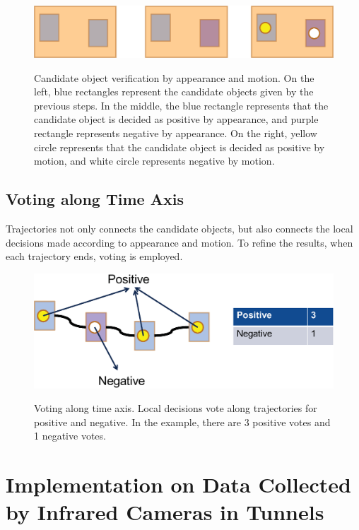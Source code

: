 \begin{figure}
\centering
{
  \includegraphics[width=1\textwidth]{add2.eps}
}
\caption[Candidate object verification]{Candidate object verification by appearance and motion. On the left, blue rectangles represent the candidate objects given by the previous steps. In the middle, the blue rectangle represents that the candidate object is decided as positive by appearance, and purple rectangle represents negative by appearance. On the right, yellow circle represents that the candidate object is decided as positive by motion, and white circle represents negative by motion. }
\label{ord:add2}
\end{figure}
\subsection{Voting along Time Axis}
Trajectories not only connects the candidate objects, but also connects the local decisions made according to appearance and motion. To refine the results, when each trajectory ends, voting is employed. 


\begin{figure}
\centering
{
  \includegraphics[width=1\textwidth]{add3.eps}
}
\caption[Voting along time axis]{Voting along time axis. Local decisions vote along trajectories for positive and negative. In the example, there are 3 positive votes and 1 negative votes.}
\label{ord:add3}
\end{figure}

\section{Implementation on Data Collected by Infrared Cameras in Tunnels}
\label{pip}

